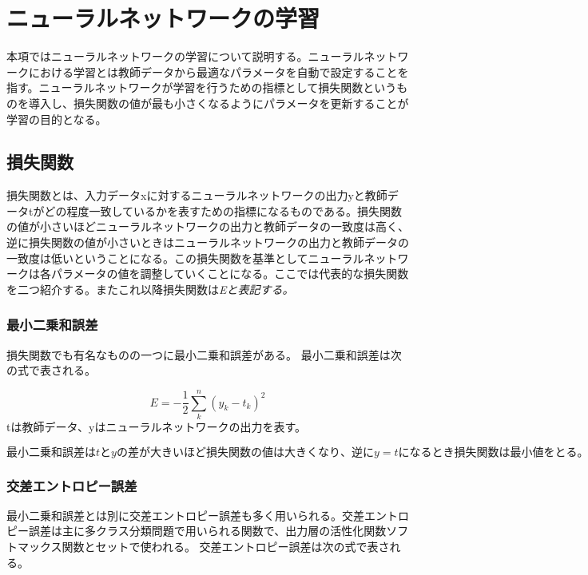 \section{ニューラルネットワークの学習}
本項ではニューラルネットワークの学習について説明する。ニューラルネットワークにおける学習とは教師データから最適なパラメータを自動で設定することを指す。ニューラルネットワークが学習を行うための指標として損失関数というものを導入し、損失関数の値が最も小さくなるようにパラメータを更新することが学習の目的となる。
\begin{flushright}
\end{flushright}

\subsection{損失関数}
損失関数とは、入力データxに対するニューラルネットワークの出力yと教師データtがどの程度一致しているかを表すための指標になるものである。損失関数の値が小さいほどニューラルネットワークの出力と教師データの一致度は高く、逆に損失関数の値が小さいときはニューラルネットワークの出力と教師データの一致度は低いということになる。この損失関数を基準としてニューラルネットワークは各パラメータの値を調整していくことになる。ここでは代表的な損失関数を二つ紹介する。またこれ以降損失関数は\sl{E}と表記する。
\begin{flushright}
\end{flushright}

\subsubsection{最小二乗和誤差}
損失関数でも有名なものの一つに最小二乗和誤差がある。
最小二乗和誤差は次の式で表される。

\begin{equation}
\label{最小二乗和誤差}
E = -\frac{1}{2}\sum_k^n (y_k - t_k)^2
\end{equation}
tは教師データ、yはニューラルネットワークの出力を表す。

$最小二乗和誤差はtとyの差が大きいほど損失関数の値は大きくなり、逆にy=tになるとき損失関数は最小値をとる。$
\begin{flushright}
\end{flushright}

\subsubsection{交差エントロピー誤差}
最小二乗和誤差とは別に交差エントロピー誤差も多く用いられる。交差エントロピー誤差は主に多クラス分類問題で用いられる関数で、出力層の活性化関数ソフトマックス関数とセットで使われる。
交差エントロピー誤差は次の式で表される。

